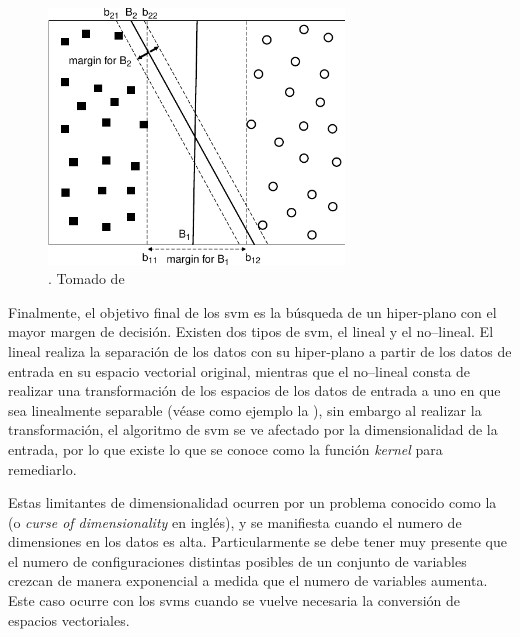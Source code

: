 \begin{figure}[H]
   \centering
   \includegraphics[width=0.7\textwidth]{Figures/svm-hyperplanes.pdf}
   \decoRule
   \caption[]{. Tomado de \cite{tan2005introduction}}
   \label{fig:svm-hyperplanes}
\end{figure}

Finalmente, el objetivo final de los \gls{svm} es la búsqueda de un hiper-plano con el mayor margen de decisión. Existen dos tipos de \gls{svm}, el lineal y el no--lineal. El lineal realiza la separación de los datos con su hiper-plano a partir de los datos de entrada en su espacio vectorial original, mientras que el no--lineal consta de realizar una transformación de los espacios de los datos de entrada a uno en que sea linealmente separable (véase como ejemplo la ), sin embargo al realizar la transformación, el algoritmo de \gls{svm} se ve afectado por la dimensionalidad de la entrada, por lo que existe lo que se conoce como la función \emph{kernel} para remediarlo.

Estas limitantes de dimensionalidad ocurren por un problema conocido como la  (o \textsl{curse of dimensionality} en inglés), y se manifiesta cuando el numero de dimensiones en los datos es alta. Particularmente se debe tener muy presente que el numero de configuraciones distintas posibles de un conjunto de variables crezcan de manera exponencial a medida que el numero de variables aumenta. Este caso ocurre con los \glspl{svm} cuando se vuelve necesaria la conversión de espacios vectoriales.

